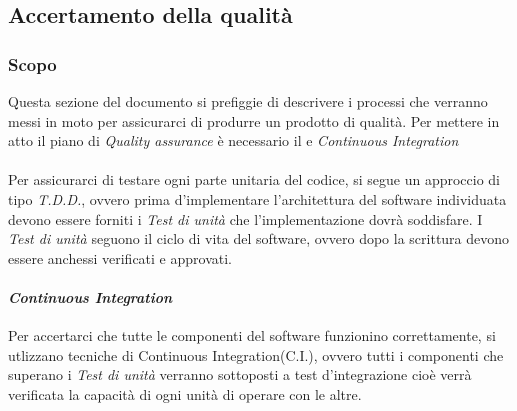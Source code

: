 \subsection{Accertamento della qualit\` a}
\subsubsection{Scopo}
Questa sezione del documento si prefiggie di descrivere i processi che verranno
messi in moto per assicurarci di produrre un prodotto di qualità.
Per mettere in atto il piano di \textit{Quality assurance\glo} è necessario il
 e \textit{Continuous Integration\glo}

\paragraph{}
Per assicurarci di testare ogni parte unitaria del codice, si segue un approccio
di tipo \textit{T.D.D.\glo}, ovvero prima d'implementare l'architettura del software
individuata devono essere forniti i \textit{Test di unità\glo} che l'implementazione dovrà soddisfare.
I \textit{Test di unità\glo} seguono il ciclo di vita del software, ovvero dopo la
scrittura devono essere anchessi verificati e approvati.

\paragraph{\textit{Continuous Integration\glo}}
Per accertarci che tutte le componenti del software funzionino correttamente, si
utlizzano tecniche di Continuous Integration(C.I.), ovvero tutti i componenti che
superano i \textit{Test di unità\glo} verranno sottoposti a test d'integrazione
cioè verrà verificata la capacità di ogni unità di operare con le altre.
